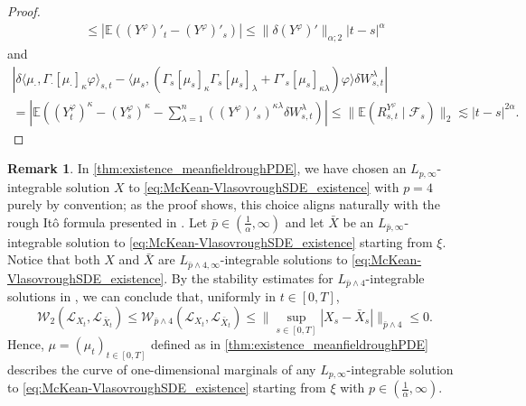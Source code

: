 \documentclass[10pt, a4paper]{article} %
\newcommand{\R}{\mathbb{R}}
\newcommand{\E}{\mathbb{E}}
\theoremstyle{definition}
\newtheorem{rmk}[defn]{Remark}
\theoremstyle{plain}
\begin{document}
\begin{proof}
\begin{multline*}
        \le |\E ((Y^\varphi)'_t - (Y^\varphi)'_s)| \le \|\delta (Y^\varphi)'\|_{\alpha;2} |t-s|^\alpha
    \end{multline*} and \begin{multline*}
        |\delta  \langle \mu_\cdot, \Gamma_\cdot[\mu_\cdot]_\kappa \varphi \rangle_{s,t} - \langle \mu_s, (\Gamma_s[\mu_s]_\kappa \Gamma_s[\mu_s]_\lambda + \Gamma'_s[\mu_s]_{\kappa\lambda} ) \varphi  \rangle \delta W^\lambda_{s,t} |  \\
        = |\E( (Y^\varphi_t)^\kappa - (Y^\varphi_s)^\kappa - \sum_{\lambda=1}^n ((Y^\varphi)'_s)^{\kappa \lambda} \delta W^\lambda_{s,t} )| \le \|\E( R^{Y^\varphi}_{s,t} \mid \mathcal{F}_s  )\|_2 \lesssim |t-s|^{2\alpha}. 
    \end{multline*}
\end{proof}






\begin{rmk}
    In \cref{thm:existence_meanfieldroughPDE}, we have chosen an $L_{p,\infty}$-integrable solution $X$ to \eqref{eq:McKean-VlasovroughSDE_existence} with $p=4$ purely by convention; as the proof shows, this choice aligns naturally with the rough Itô formula presented in \cite[Theorem 4.13]{FHL21}. 
    Let $\bar p \in (\frac{1}{\alpha},\infty)$ and let $\bar X$ be an $L_{\bar p,\infty}$-integrable solution to \eqref{eq:McKean-VlasovroughSDE_existence} starting from $\xi$. 
    Notice that both $X$ and $\bar X$ are $L_{\bar p \wedge 4,\infty}$-integrable solutions to \eqref{eq:McKean-VlasovroughSDE_existence}.
    By the stability estimates for $L_{\bar p \wedge 4}$-integrable solutions in \cite[Theorem 3.11]{FHL25},  we can conclude that, uniformly in $t \in [0,T]$, \begin{equation*}
        \mathcal{W}_2(\mathcal{L}_{X_t}, \mathcal{L}_{\bar X_t}) \le \mathcal{W}_{\bar p \wedge 4}(\mathcal{L}_{X_t}, \mathcal{L}_{\bar X_t}) \le \big\| \sup_{s \in [0,T]} |X_s - \bar X_s| \big\|_{\bar p \wedge 4} \le 0. 
    \end{equation*}
    Hence, $\mu=(\mu_t)_{t \in [0,T]}$ defined as in \cref{thm:existence_meanfieldroughPDE} describes the curve of one-dimensional marginals of any $L_{p,\infty}$-integrable solution to \eqref{eq:McKean-VlasovroughSDE_existence} starting from $\xi$ with $p \in (\frac{1}{\alpha}, \infty)$. 
\end{rmk}
\end{document}
